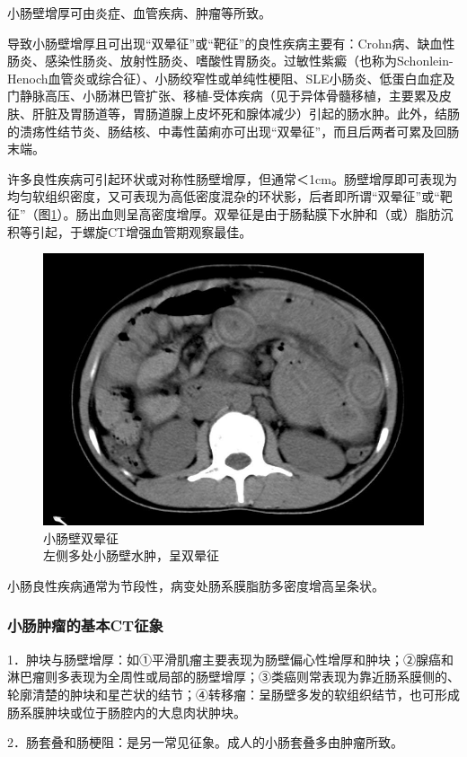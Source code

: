 小肠壁增厚可由炎症、血管疾病、肿瘤等所致。

导致小肠壁增厚且可出现“双晕征”或“靶征”的良性疾病主要有：Crohn病、缺血性肠炎、感染性肠炎、放射性肠炎、嗜酸性胃肠炎。过敏性紫癜（也称为Schonlein-Henoch血管炎或综合征）、小肠绞窄性或单纯性梗阻、SLE小肠炎、低蛋白血症及门静脉高压、小肠淋巴管扩张、移植-受体疾病（见于异体骨髓移植，主要累及皮肤、肝脏及胃肠道等，胃肠道腺上皮坏死和腺体减少）引起的肠水肿。此外，结肠的溃疡性结节炎、肠结核、中毒性菌痢亦可出现“双晕征”，而且后两者可累及回肠末端。

许多良性疾病可引起环状或对称性肠壁增厚，但通常＜1cm。肠壁增厚即可表现为均匀软组织密度，又可表现为高低密度混杂的环状影，后者即所谓“双晕征”或“靶征”（图\ref{fig17-12}）。肠出血则呈高密度增厚。双晕征是由于肠黏膜下水肿和（或）脂肪沉积等引起，于螺旋CT增强血管期观察最佳。

\begin{figure}[!htbp]
 \centering
 \includegraphics[width=.7\textwidth,height=\textheight,keepaspectratio]{./images/Image00364.jpg}
 \captionsetup{justification=centering}
 \caption{小肠壁双晕征\\{\small 左侧多处小肠壁水肿，呈双晕征}}
 \label{fig17-12}
  \end{figure} 

小肠良性疾病通常为节段性，病变处肠系膜脂肪多密度增高呈条状。

\subsubsection{小肠肿瘤的基本CT征象}

1．肿块与肠壁增厚：如①平滑肌瘤主要表现为肠壁偏心性增厚和肿块；②腺癌和淋巴瘤则多表现为全周性或局部的肠壁增厚；③类癌则常表现为靠近肠系膜侧的、轮廓清楚的肿块和星芒状的结节；④转移瘤：呈肠壁多发的软组织结节，也可形成肠系膜肿块或位于肠腔内的大息肉状肿块。

2．肠套叠和肠梗阻：是另一常见征象。成人的小肠套叠多由肿瘤所致。

